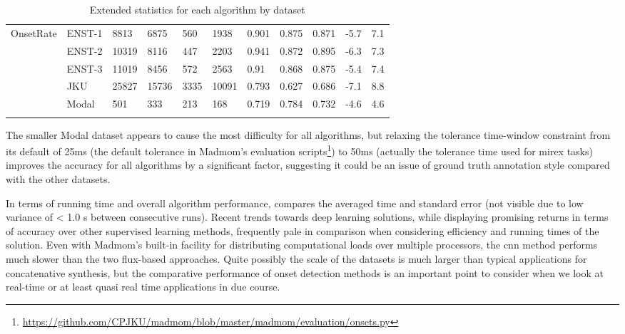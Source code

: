 {\begin{table}
\begin{threeparttable}
\begin{centering}
\begin{tabular}{l l l l l l l l l l l}
          \hdashline
OnsetRate & ENST-1  & 8813   & 6875  & 560  & 1938  & 0.901     & 0.875  & 0.871     & -5.7 & 7.1 \\
          & ENST-2  & 10319  & 8116  & 447  & 2203  & 0.941     & 0.872  & 0.895     & -6.3 & 7.3 \\
          & ENST-3  & 11019  & 8456  & 572  & 2563  & 0.91      & 0.868  & 0.875     & -5.4 & 7.4 \\
          & JKU     & 25827  & 15736 & 3335 & 10091 & 0.793     & 0.627  & 0.686     & -7.1 & 8.8 \\
          & Modal   & 501    & 333   & 213  & 168   & 0.719     & 0.784  & 0.732     & -4.6 & 4.6 \\
				\tablebot		
			\end{tabular}
			\par \end{centering}		
		\begin{tablenotes}
			\small
		\end{tablenotes}
			\caption[Extended statistics for each algorithm by dataset]{Extended statistics for each algorithm by dataset}
			\label{tab:extended_onset_statistics}
	\end{threeparttable}
\end{table}

The smaller Modal dataset appears to cause the most difficulty for all algorithms, but relaxing the tolerance time-window constraint from its default of 25ms (the default tolerance in Madmom's evaluation scripts\footnote{\url{https://github.com/CPJKU/madmom/blob/master/madmom/evaluation/onsets.py}}) to 50ms (actually the tolerance time used for \acrshort{mirex} tasks) improves the accuracy for all algorithms by a significant factor, suggesting it could be an issue of ground truth annotation style compared with the other datasets.

In terms of running time and overall algorithm performance,  compares the averaged time and standard error (not visible due to low variance of < 1.0 s between consecutive runs). Recent trends towards deep learning solutions, while displaying promising returns in terms of accuracy over other supervised learning methods, frequently pale in comparison when considering efficiency and running times of the solution. Even with Madmom's built-in facility for distributing computational loads over multiple processors, the \acrshort{cnn} method performs much slower than the two flux-based approaches. Quite possibly the scale of the datasets is much larger than typical applications for concatenative synthesis, but the comparative performance of onset detection methods is an important point to consider when we look at real-time or at least quasi real time applications in due course.

}

